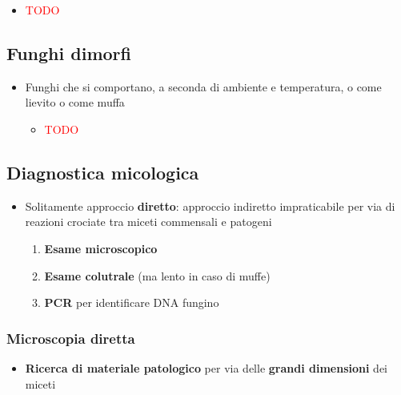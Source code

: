 \documentclass[italian,]{article}
\providecommand{\tightlist}{%
  \setlength{\itemsep}{0pt}\setlength{\parskip}{0pt}}
\newcommand{\TODO}[1]{\textcolor{red}{\textsf{\footnotesize{TODO #1}}}} %
\begin{document}
\begin{itemize}
\item
  \TODO{}
\end{itemize}

\hypertarget{funghi-dimorfi}{%
\subsection{Funghi dimorfi}\label{funghi-dimorfi}}

\begin{itemize}
\tightlist
\item
  Funghi che si comportano, a seconda di ambiente e temperatura, o come
  lievito o come muffa

  \begin{itemize}
  \item
    \TODO{}
  \end{itemize}
\end{itemize}

\hypertarget{diagnostica-micologica}{%
\subsection{Diagnostica micologica}\label{diagnostica-micologica}}

\begin{itemize}
\tightlist
\item
  Solitamente approccio \textbf{diretto}: approccio indiretto
  impraticabile per via di reazioni crociate tra miceti commensali e
  patogeni

  \begin{enumerate}
  \def\labelenumi{\arabic{enumi}.}
  \tightlist
  \item
    \textbf{Esame microscopico}
  \item
    \textbf{Esame colutrale} (ma lento in caso di muffe)
  \item
    \textbf{PCR} per identificare DNA fungino
  \end{enumerate}
\end{itemize}

\hypertarget{microscopia-diretta}{%
\subsubsection{Microscopia diretta}\label{microscopia-diretta}}

\begin{itemize}
\tightlist
\item
  \textbf{Ricerca di materiale patologico} per via delle \textbf{grandi
  dimensioni} dei miceti
\end{itemize}
\end{document}
